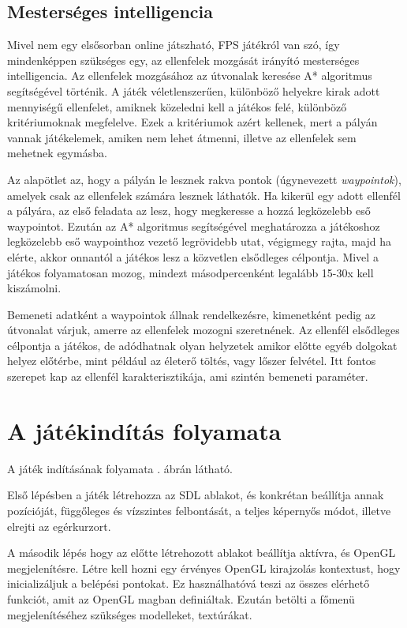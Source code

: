 \subsection{Mesterséges intelligencia}

Mivel nem egy elsősorban online játszható, FPS játékról van szó, így mindenképpen szükséges egy, az ellenfelek mozgását irányító mesterséges intelligencia. Az ellenfelek mozgásához az útvonalak keresése A* algoritmus segítségével történik. A játék véletlenszerűen, különböző helyekre kirak adott mennyiségű ellenfelet, amiknek közeledni kell a játékos felé, különböző kritériumoknak megfelelve. Ezek a kritériumok azért kellenek, mert a pályán vannak játékelemek, amiken nem lehet átmenni, illetve az ellenfelek sem mehetnek egymásba. 

Az alapötlet az, hogy a pályán le lesznek rakva pontok (úgynevezett \textit{waypointok}), amelyek csak az ellenfelek számára lesznek láthatók. Ha kikerül egy adott ellenfél a pályára, az első feladata az lesz, hogy megkeresse a hozzá legközelebb eső waypointot. Ezután az A* algoritmus segítségével meghatározza a játékoshoz legközelebb eső waypointhoz vezető legrövidebb utat, végigmegy rajta, majd ha elérte, akkor onnantól a játékos lesz a közvetlen elsődleges célpontja. Mivel a játékos folyamatosan mozog, mindezt másodpercenként legalább 15-30x kell kiszámolni.

Bemeneti adatként a waypointok állnak rendelkezésre, kimenetként pedig az útvonalat várjuk, amerre az ellenfelek mozogni szeretnének. Az ellenfél elsődleges célpontja a játékos, de adódhatnak olyan helyzetek amikor előtte egyéb dolgokat helyez előtérbe, mint például az életerő töltés, vagy lőszer felvétel. Itt fontos szerepet kap az ellenfél karakterisztikája, ami szintén bemeneti paraméter.

\newpage
\section{A játékindítás folyamata}

A játék indításának folyamata . ábrán látható.

Első lépésben a játék létrehozza az SDL ablakot, és konkrétan beállítja annak pozícióját, függőleges és vízszintes felbontását, a teljes képernyős módot, illetve elrejti az egérkurzort.

A második lépés hogy az előtte létrehozott ablakot beállítja aktívra, és OpenGL megjelenítésre. Létre kell hozni egy érvényes OpenGL kirajzolás kontextust, hogy inicializáljuk a belépési pontokat. Ez használhatóvá teszi az összes elérhető funkciót, amit az OpenGL magban definiáltak. Ezután betölti a főmenü megjelenítéséhez szükséges modelleket, textúrákat.


